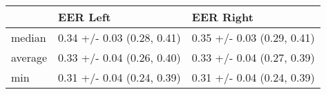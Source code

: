 \begin{tabular}{lll}
\toprule
{} &                    EER Left &                   EER Right \\
\midrule
median  &  0.34 +/- 0.03 (0.28, 0.41) &  0.35 +/- 0.03 (0.29, 0.41) \\
average &  0.33 +/- 0.04 (0.26, 0.40) &  0.33 +/- 0.04 (0.27, 0.39) \\
min     &  0.31 +/- 0.04 (0.24, 0.39) &  0.31 +/- 0.04 (0.24, 0.39) \\
\bottomrule
\end{tabular}
